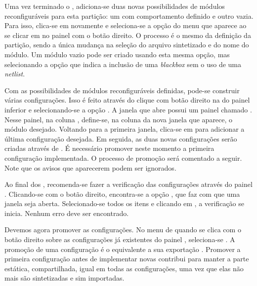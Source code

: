 \documentclass[11pt,a4paper,oneside]{book}
\begin{document}
Uma vez terminado o , adiciona-se duas novas possibilidades de módulos reconfiguráveis para esta partição: um com comportamento definido e outro vazia.
Para isso, clica-se em  novamente e seleciona-se a opção  do menu que aparece ao se clicar em  no painel  com o botão direito.
O processo é o mesmo da definição da partição, sendo a única mudança na seleção do arquivo sintetizado e do nome do módulo.
Um módulo vazio pode ser criado usando esta mesma opção, mas selecionando a opção que indica a inclusão de uma \textit{blackbox} sem o uso de uma \textit{netlist}.

Com as possibilidades de módulos reconfiguráveis definidas, pode-se construir várias configurações.
Isso é feito através do clique com botão direito na  do painel inferior e selecionando-se a opção .
A janela que abre possui um painel chamado .
Nesse painel, na coluna , define-se, na coluna  da nova janela que aparece, o módulo desejado.
Voltando para a primeira janela, clica-se em  para adicionar a última configuração desejada.
Em seguida, as duas novas configurações serão criadas através de .
É necessário promover neste momento a primeira configuração implementada.
O processo de promoção será comentado a seguir.
Note que os avisos que aparecerem podem ser ignorados.

Ao final dos , recomenda-se fazer a verificação das configurações através do painel .
Clicando-se com o botão direito, encontra-se a opção , que faz com que uma janela seja aberta.
Selecionado-se todos os itens e clicando em , a verificação se inicia.
Nenhum erro deve ser encontrado.

Devemos agora promover as configurações.
No menu de quando se clica com o botão direito sobre as configurações já existentes do painel , seleciona-se .
A promoção de uma configuração é o equivalente a sua exportação \cite{ug748}.
Promover a primeira configuração antes de implementar novas contribui para manter a parte estática, compartilhada, igual em todas as configurações, uma vez que elas não mais são sintetizadas e sim importadas.
\end{document}
